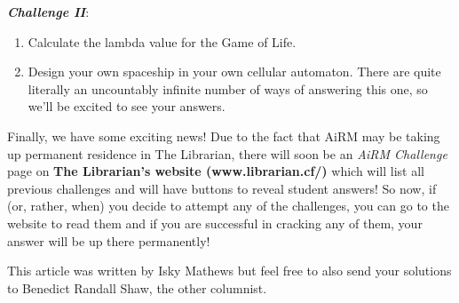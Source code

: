 \textbf{\emph{Challenge II}}:

\begin{enumerate}
\def\labelenumi{\arabic{enumi}.}
\item
  Calculate the lambda value for the Game of Life.
\item
  Design your own spaceship in your own cellular automaton. There are
  quite literally an uncountably infinite number of ways of answering
  this one, so we'll be excited to see your answers.
\end{enumerate}

Finally, we have some exciting news! Due to the fact that AiRM may be
taking up permanent residence in The Librarian, there will soon be an
\emph{AiRM Challenge} page on \textbf{The Librarian's website
(www.librarian.cf/)} which will list all previous challenges and will
have buttons to reveal student answers! So now, if (or, rather, when)
you decide to attempt any of the challenges, you can go to the website
to read them and if you are successful in cracking any of them, your
answer will be up there permanently!

This article was written by Isky Mathews but feel free to also send your
solutions to Benedict Randall Shaw, the other columnist.
